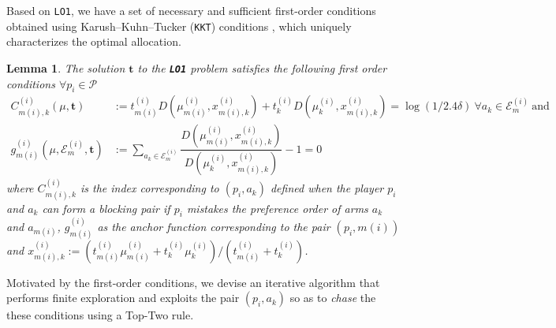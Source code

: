 \documentclass{article}
\newtheorem{lemma}[theorem]{Lemma}
\begin{document}
Based on \texttt{LO1}, we have a set of necessary and sufficient first-order conditions obtained using Karush–Kuhn–Tucker (\texttt{KKT}) conditions \cite{Boyd_Vandenberghe_2004}, which uniquely characterizes the optimal allocation. 
\begin{lemma}
\label{lemma:firstone_sided}
    The solution $\bm{t}$ to the \texttt{\textbf{LO1}} problem satisfies the following first order conditions $\forall p_i\in\mathcal{P}$
    \begin{align*}
    C^{(i)}_{m(i),k}(\mu,\bm{t})&:=t^{(i)}_{m(i)}D\left(\mu^{(i)}_{m(i)},x^{(i)}_{m(i),k}\right) +t^{(i)}_{k}D\left(\mu^{(i)}_{k},x^{(i)}_{m(i),k}\right)= \log(1/2.4\delta)\ \forall a_k\in\mathcal{E}^{(i)}_m \ \text{and}\\
    g^{(i)}_{m(i)}(\mu,\mathcal{E}_{m}^{(i)},\bm{t})&:=\sum_{a_k\in\mathcal{E}_{m}^{(i)}}\dfrac{D\left(\mu^{(i)}_{m(i)},x^{(i)}_{m(i),k}\right)}{D\left(\mu^{(i)}_{k},x^{(i)}_{m(i),k}\right)} -1=0
\end{align*}
where $C^{(i)}_{m(i),k}$ is the index corresponding to $(p_i,a_k)$ defined when the player $p_i$ and $a_k$ can form a blocking pair if $p_i$ mistakes the preference order of arms $a_k$ and $a_{m(i)}$, $g^{(i)}_{m(i)}$ as the anchor function corresponding to the pair $(p_i,m(i))$ and $x^{(i)}_{m(i),k}:=(t^{(i)}_{m(i)}\mu^{(i)}_{m(i)}+t^{(i)}_{k}\mu^{(i)}_{k})/(t^{(i)}_{m(i)}+t^{(i)}_{k})$.
\end{lemma}

Motivated by the first-order conditions, we devise an iterative algorithm that performs finite exploration and exploits the pair $(p_i,a_k)$ so as to \textit{chase} the these conditions using a Top-Two rule. 
\end{document}

